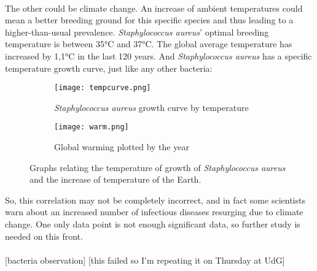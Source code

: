 \paragraph{}The other could be climate change. An increase of ambient temperatures could mean a better breeding ground for this specific species and thus leading to a higher-than-usual prevalence. \emph{Staphylococcus aureus}' optimal breeding temperature is between 35\si{\celsius} and 37\si{\celsius}. The global average temperature has increased by 1,1\si{\celsius}\cite{gmsGMSAnnualGlobal2016} in the last 120 years. And \emph{Staphylococcus aureus} has a specific temperature growth curve, just like any other bacteria:\begin{figure}[H]\centering\begin{subfigure}[b]{0.4\linewidth}\texttt{[image: tempcurve.png]}\caption{\emph{Staphylococcus aureus} growth curve by temperature\cite{FigEffectTemperature2022}}\end{subfigure}\begin{subfigure}[b]{0.4\linewidth}\texttt{[image: warm.png]}\caption{Global warming plotted by the year\cite{GlobalWarming2010}}\end{subfigure}\caption{Graphs relating the temperature of growth of \emph{Staphylococcus aureus} and the increase of temperature of the Earth.}\end{figure}So, this correlation may not be completely incorrect, and in fact some scientists warn about an increased number of infectious diseases resurging due to climate change. One only data point is not enough significant data, so further study is needed on this front.
\paragraph{}[bacteria observation] [this failed so I'm repeating it on Thursday at UdG]
